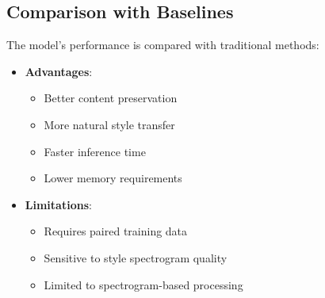 \subsection{Comparison with Baselines}
The model's performance is compared with traditional methods:

\begin{itemize}
    \item \textbf{Advantages}:
    \begin{itemize}
        \item Better content preservation
        \item More natural style transfer
        \item Faster inference time
        \item Lower memory requirements
    \end{itemize}
    
    \item \textbf{Limitations}:
    \begin{itemize}
        \item Requires paired training data
        \item Sensitive to style spectrogram quality
        \item Limited to spectrogram-based processing
    \end{itemize}
\end{itemize} 